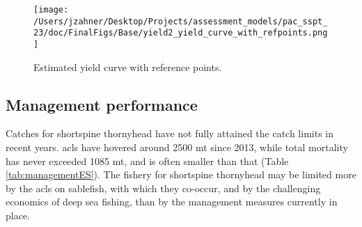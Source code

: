 \documentclass[11pt,
  letterpaper,
]{article}
\begin{document}
\begin{figure}
{\centering
\texttt{[image: /Users/jzahner/Desktop/Projects/assessment\_models/pac\_sspt\_23/doc/FinalFigs/Base/yield2\_yield\_curve\_with\_refpoints.png]}
}
\caption{Estimated yield curve with reference points.\label{fig:yieldcurveES}}
\end{figure}

\hypertarget{management-performance}{%
\subsection*{Management performance}\label{management-performance}}

Catches for shortspine thornyhead have not fully attained the catch limits in recent years. \Gls{acl}s have hovered around 2500 mt since 2013, while total mortality has never exceeded 1085 mt, and is often smaller than that (Table \ref{tab:managementES}). The fishery for shortspine thornyhead may be limited more by the \gls{acl}s on sablefish, with which they co-occur, and by the challenging economics of deep sea fishing, than by the management measures currently in place.

\clearpage

\begingroup\fontsize{10}{12}\selectfont
\begingroup\fontsize{10}{12}\selectfont
\end{document}
